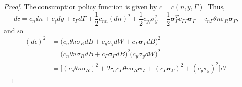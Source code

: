 \documentclass[11pt]{extarticle}
\theoremstyle{plain}
\theoremstyle{definition}
\begin{document}
\begin{enumerate}[(a)]
\begin{proof}
	The consumption policy function is given by $c = c(n, y, \Gamma)$. Thus, 
	\begin{equation*}
		dc = c_n dn + c_y dy + c_\Gamma d \Gamma  + \frac{1}{2} c_{nn} (dn)^2 + \frac{1}{2} c_{yy} \sigma_y^2 + \frac{1}{2} \bm \sigma_\Gamma^T c_{\Gamma \Gamma} \bm \sigma_\Gamma + c_{n \Gamma} \theta n \sigma_R \bm \sigma_\Gamma,
	\end{equation*}
	and so 
	\begin{align*}
		(dc)^2 &= \bigg( c_n \theta n \sigma_R dB + c_y \sigma_y dW + c_\Gamma \bm \sigma_\Gamma dB \bigg)^2 \\
		&= \bigg( c_n \theta n \sigma_R dB + c_\Gamma \bm \sigma_\Gamma dB \bigg)^2 \bigg( c_y \sigma_y dW \bigg)^2 \\
		&= \bigg[ (c_n \theta n \sigma_R)^2 + 2 c_n c_\Gamma \theta n \sigma_R \bm \sigma_\Gamma + (c_\Gamma \bm \sigma_\Gamma)^2 + (c_y \sigma_y)^2 \bigg] dt.
	\end{align*}
	
	
	
	
	

\end{proof}
\end{enumerate}
\end{document}
